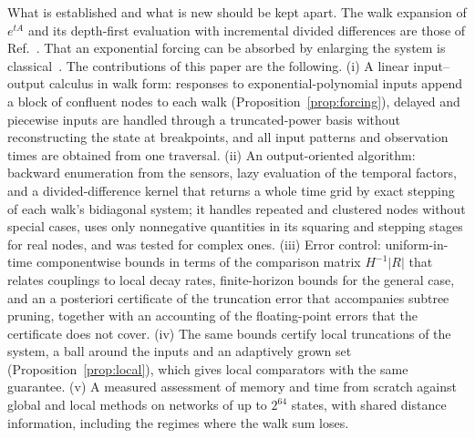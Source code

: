 \documentclass[aps,pra,superscriptaddress,floatfix,longbibliography,twocolumn]{revtex4-2}
\begin{document}
What is established and what is new should be kept apart. The walk expansion of $e^{tA}$ and its depth-first evaluation with incremental divided differences are those of Ref.~\cite{barash2022}. That an exponential forcing can be absorbed by enlarging the system is classical~\cite{vanloan1978,almohy2011}. The contributions of this paper are the following. (i) A linear input--output calculus in walk form: responses to exponential-polynomial inputs append a block of confluent nodes to each walk (Proposition~\ref{prop:forcing}), delayed and piecewise inputs are handled through a truncated-power basis without reconstructing the state at breakpoints, and all input patterns and observation times are obtained from one traversal. (ii) An output-oriented algorithm: backward enumeration from the sensors, lazy evaluation of the temporal factors, and a divided-difference kernel that returns a whole time grid by exact stepping of each walk's bidiagonal system; it handles repeated and clustered nodes without special cases, uses only nonnegative quantities in its squaring and stepping stages for real nodes, and was tested for complex ones. (iii) Error control: uniform-in-time componentwise bounds in terms of the comparison matrix $H^{-1}|R|$ that relates couplings to local decay rates, finite-horizon bounds for the general case, and an a posteriori certificate of the truncation error that accompanies subtree pruning, together with an accounting of the floating-point errors that the certificate does not cover. (iv) The same bounds certify local truncations of the system, a ball around the inputs and an adaptively grown set (Proposition~\ref{prop:local}), which gives local comparators with the same guarantee. (v) A measured assessment of memory and time from scratch against global and local methods on networks of up to $2^{64}$ states, with shared distance information, including the regimes where the walk sum loses.
\end{document}
